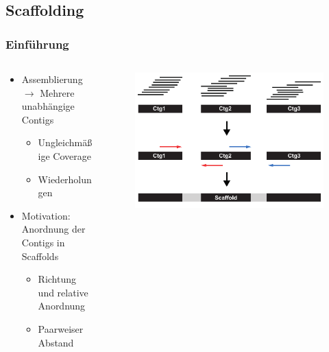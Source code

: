 \documentclass[xcolor=pst]{beamer}
\begin{document}
\subsection{Scaffolding}
\begin{frame}
\setcounter{framenumber}{1}
  \frametitle{Einführung}

  \begin{columns}
    \begin{column}{.45\textwidth}
      \begin{itemize}
      \item Assemblierung $\rightarrow$ Mehrere unabhängige Contigs
      \begin{itemize}
        \item Ungleichmäßige Coverage
        \item Wiederholungen
      \end{itemize}
      \item Motivation: Anordnung der Contigs in Scaffolds
      \begin{itemize}
        \item Richtung und relative Anordnung
        \item Paarweiser Abstand
      \end{itemize}
      \end{itemize}
    \end{column}
    \begin{column}{.45\textwidth}
      \begin{center}
        \begin{figure}[t]
          \includegraphics[width=\textwidth,height=0.8\textheight,keepaspectratio]{figures/Scaffolding.pdf}
        \end{figure}
      \end{center}
    \end{column}
  \end{columns}
\end{frame}
\end{document}
